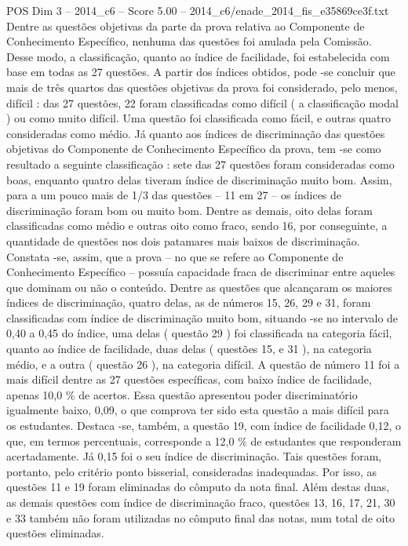 \begin{textsample}{POS Dim 3 – 2014\_c6 – Score 5.00 – 2014\_c6/enade\_2014\_fis\_e35869ce3f.txt}
Dentre as questões objetivas da parte da prova relativa ao Componente de Conhecimento Específico, nenhuma das questões foi anulada pela Comissão.
Desse modo, a classificação, quanto ao índice de facilidade, foi estabelecida com base em todas as 27 questões.
A partir dos índices obtidos, pode -se concluir que mais de três quartos das questões objetivas da prova foi considerado, pelo menos, difícil : das 27 questões, 22 foram classificadas como difícil ( a classificação modal ) ou como muito difícil.
Uma questão foi classificada como fácil, e outras quatro consideradas como médio.
Já quanto aos índices de discriminação das questões objetivas do Componente de Conhecimento Específico da prova, tem -se como resultado a seguinte classificação : sete das 27 questões foram consideradas como boas, enquanto quatro delas tiveram índice de discriminação muito bom.
Assim, para a um pouco mais de 1/3 das questões – 11 em 27 – os índices de discriminação foram bom ou muito bom.
Dentre as demais, oito delas foram classificadas como médio e outras oito como fraco, sendo 16, por conseguinte, a quantidade de questões nos dois patamares mais baixos de discriminação.
Constata -se, assim, que a prova – no que se refere ao Componente de Conhecimento Específico – possuía capacidade fraca de discriminar entre aqueles que dominam ou não o conteúdo.
Dentre as questões que alcançaram os maiores índices de discriminação, quatro delas, as de números 15, 26, 29 e 31, foram classificadas com índice de discriminação muito bom, situando -se no intervalo de 0,40 a 0,45 do índice, uma delas ( questão 29 ) foi classificada na categoria fácil, quanto ao índice de facilidade, duas delas ( questões 15, e 31 ), na categoria médio, e a outra ( questão 26 ), na categoria difícil.
A questão de número 11 foi a mais difícil dentre as 27 questões específicas, com baixo índice de facilidade, apenas 10,0 \% de acertos.
Essa questão apresentou poder discriminatório igualmente baixo, 0,09, o que comprova ter sido esta questão a mais difícil para os estudantes.
Destaca -se, também, a questão 19, com índice de facilidade 0,12, o que, em termos percentuais, corresponde a 12,0 \% de estudantes que responderam acertadamente.
Já 0,15 foi o seu índice de discriminação.
Tais questões foram, portanto, pelo critério ponto bisserial, consideradas inadequadas.
Por isso, as questões 11 e 19 foram eliminadas do cômputo da nota final.
Além destas duas, as demais questões com índice de discriminação fraco, questões 13, 16, 17, 21, 30 e 33 também não foram utilizadas no cômputo final das notas, num total de oito questões eliminadas.

\end{textsample}
